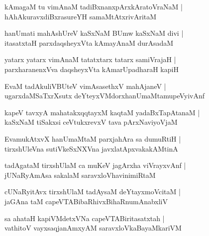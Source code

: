 \documentclass[twoside,12pt,openright]{book}
\newcounter{shloka}[chapter]
\begin{document}
\begin{shloka}%
kAmagaM tu vimAnaM tadiBxnanxpArxkAratoVraNaM |\\
hAhAkuravxdiBxrasureYH samaMtAtxrivAritaM 
\end{shloka}

\begin{shloka}%
hanUmati mahAshUreV kaSxNaM BUmw kaSxNaM divi |\\
itasatxtaH parxdaqsheyxVta kAmayAnaM durAsadaM 
\end{shloka}

\begin{shloka}%
yatarx yatarx vimAnaM tatatxtarx tatarx samiVrajaH |\\
parxharanenxVva daqsheyxVta kAmarUpadharaH kapiH 
\end{shloka}

\begin{shloka}%
EvaM tadAkuliVBUteV vimAsasethxV mahAjaneV |\\
ugarxdaMSaTxrXsutx deYteyxVMdorxhanUmaMtamupeVyivAnf 
\end{shloka}

\begin{shloka}%
kapeV tavxyA mahatakxqqtayxM kaqtaM yadaBxTapAtanaM |\\
kaSxNaM  tiSakxsi ceVtukxrevxV tava pArxNaviyoVjaM 
\end{shloka}

\begin{shloka}%
EvamukAtxvX hanUmaMtaM parxjahAra sa dumuRtiH |\\
tirxshUleVna sutiVkeSxNXVna javxlatApxvakakAMtinA 
\end{shloka}

\begin{shloka}%
tadAgataM tirxshUlaM ca muKeV jagArxha viVrayxvAnf |\\
jUNaRyAmAsa sakalaM saravxloVhavinimiRtaM
\end{shloka}

\begin{shloka}%
cUNaRyitAvx tirxshUlaM tadAysaM deYtayxmoVcitaM |\\
jaGAna taM capeVTABibaRhivxBihaRnumAnabxliV 
\end{shloka}

\begin{shloka}%
sa ahataH kapiVMdetxVNa capeVTABiritasatxtah |\\
vathitoV vayxsaqjanAmxyAM saravxloVkaBayaMkariVM 
\end{shloka}
\end{document}
